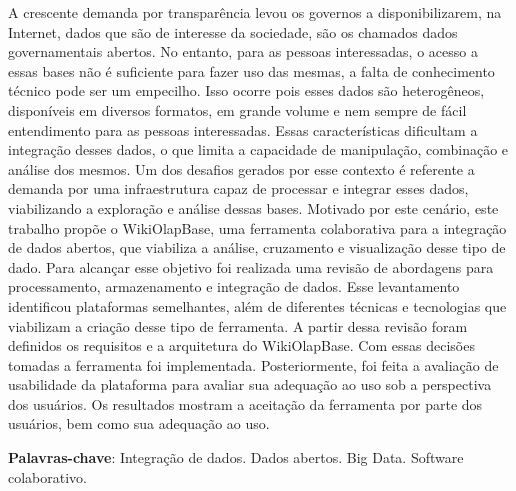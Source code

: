 
\begin{resumo}
   
   A crescente demanda por transparência levou os governos a disponibilizarem, na Internet, 
   dados que são de interesse da sociedade, são os chamados dados governamentais abertos. No 
   entanto, para as pessoas interessadas, o acesso a essas bases não é suficiente para fazer 
   uso das mesmas, a falta de conhecimento técnico pode ser um empecilho. Isso ocorre pois 
   esses dados são heterogêneos, disponíveis em diversos formatos, em grande volume e nem 
   sempre de fácil entendimento para as pessoas interessadas. Essas características dificultam 
   a integração desses dados, o que limita a capacidade de manipulação, combinação e análise 
   dos mesmos. Um dos desafios gerados por esse contexto é referente a demanda por uma 
   infraestrutura capaz de processar e integrar esses dados, viabilizando a exploração e 
   análise dessas bases. Motivado por este cenário, este trabalho propõe o WikiOlapBase,
   uma ferramenta colaborativa para a integração de dados abertos, que viabiliza a análise, 
   cruzamento e visualização desse tipo de dado. Para alcançar esse objetivo foi realizada 
   uma revisão de abordagens para processamento, armazenamento e integração de dados. 
   Esse levantamento identificou plataformas semelhantes, além de diferentes técnicas e 
   tecnologias que viabilizam a criação desse tipo de ferramenta. A partir dessa revisão foram 
   definidos os requisitos e a arquitetura do WikiOlapBase. Com essas decisões tomadas a 
   ferramenta foi implementada. Posteriormente, foi feita a avaliação de usabilidade da 
   plataforma para avaliar sua adequação ao uso sob a perspectiva dos usuários. 
   Os resultados mostram a aceitação da ferramenta por parte dos usuários, bem como sua 
   adequação ao uso.

    \textbf{Palavras-chave}: Integração de dados. Dados abertos. Big Data. Software colaborativo.
\end{resumo}

